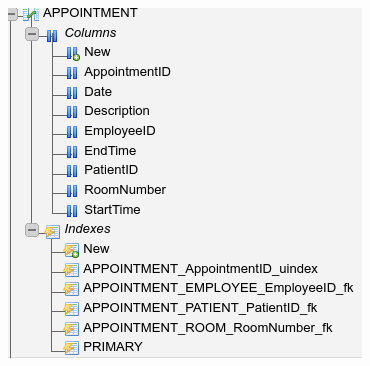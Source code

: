 \documentclass[11pt]{article}
\makeatletter
\def\maxwidth{\ifdim\Gin@nat@width>\linewidth\linewidth
    \else\Gin@nat@width\fi}
\let\Oldincludegraphics\includegraphics
\renewcommand{\includegraphics}[1]{\Oldincludegraphics[width=.8\maxwidth]{#1}}
\makeatother
\begin{document}
    \begin{figure}[H]
\centering
\includegraphics{appointment_1.png}
\caption{}
\end{figure}
\end{document}
